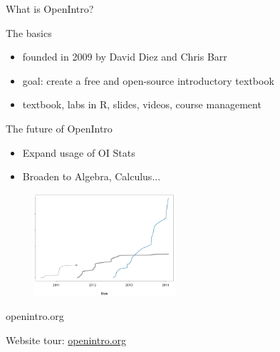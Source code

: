 \begin{frame}{What is OpenIntro?}

\begin{block}{The basics}
\begin{itemize}
        \item founded in 2009 by David Diez and Chris Barr
        \item goal: create a free and open-source introductory textbook 
        \item textbook, labs in R, slides, videos, course management
\end{itemize}
\end{block}

\begin{minipage}{0.5\linewidth}
\begin{block}{The future of OpenIntro}
\begin{itemize}
\item Expand usage of OI Stats
\item Broaden to Algebra, Calculus...
\end{itemize}
\end{block}
\end{minipage}
\begin{minipage}{0.45\linewidth}
\begin{figure}
   \includegraphics[height = 1.5in]{oiUsage.png}
\end{figure}
\end{minipage}

\end{frame}


\begin{frame}{openintro.org}

Website tour: \href{http://www.openintro.org}{openintro.org}

\end{frame}


